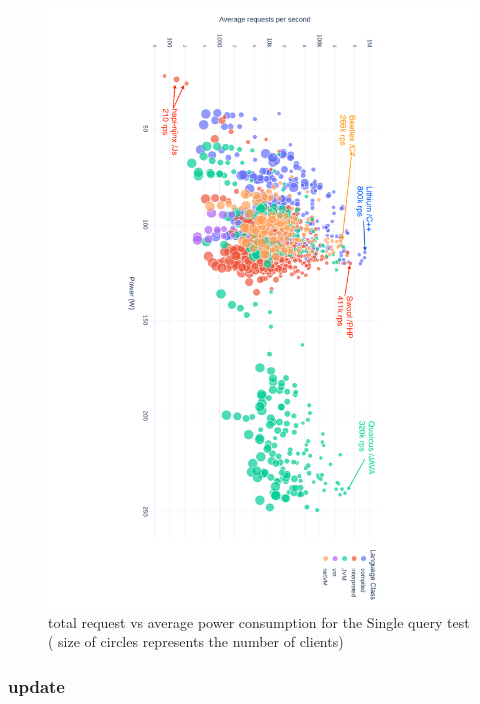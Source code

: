 \begin{figure}[hbt]
    \caption{total request vs average power consumption for the Single query test ( size of circles represents the number of clients) }
    \label{fig:power_requests_query}
    \includegraphics[width=
        \columnwidth,angle=9
        0]{imgs/power_requests_query_log}

\end{figure}

\subsubsection{update}


